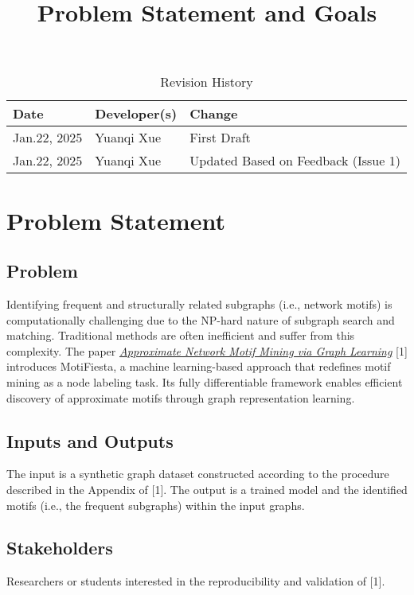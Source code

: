 \documentclass{article}
\title{Problem Statement and Goals}
\author{\authname}
\date{}
\begin{document}
\maketitle

\begin{table}[hp]
\caption{Revision History} \label{TblRevisionHistory}
\begin{tabularx}{\textwidth}{llX}
\toprule
\textbf{Date} & \textbf{Developer(s)} & \textbf{Change}\\
\midrule
Jan.22, 2025 & Yuanqi Xue & First Draft\\
Jan.22, 2025 & Yuanqi Xue & Updated Based on Feedback (Issue 1)\\
\bottomrule
\end{tabularx}
\end{table}

\section{Problem Statement}
\subsection{Problem}
Identifying frequent and structurally related subgraphs (i.e., network motifs) is computationally challenging due to the NP-hard nature of subgraph search and matching. Traditional methods are often inefficient and suffer from this complexity. The paper  \href{https://arxiv.org/abs/2206.01008}{\textit{Approximate Network Motif Mining via Graph Learning}} [1] introduces MotiFiesta, a machine learning-based approach that redefines motif mining as a node labeling task. Its fully differentiable framework enables efficient discovery of approximate motifs through graph representation learning.

\subsection{Inputs and Outputs}
The input is a synthetic graph dataset constructed according to the procedure described in the Appendix of [1]. The output is a trained model and the identified motifs (i.e., the frequent subgraphs) within the input graphs.


\subsection{Stakeholders}
Researchers or students interested in the reproducibility and validation of [1].
\end{document}

